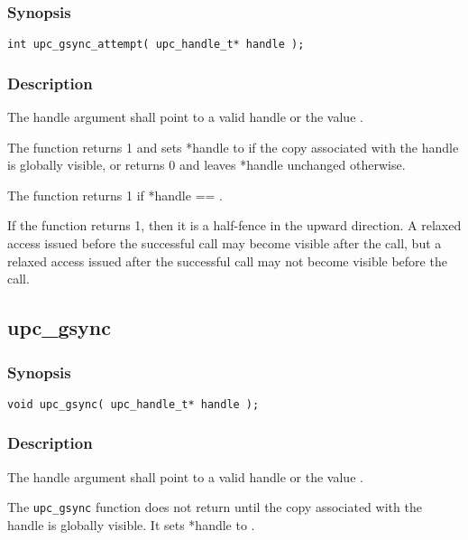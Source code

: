 \subsubsection{Synopsis}

\begin{verbatim}
int upc_gsync_attempt( upc_handle_t* handle ); 
\end{verbatim}

\subsubsection{Description}

\npf The handle argument shall point to a valid handle or the value
\complete{}.

\np The \function{} function returns 1 and sets *handle to \complete{}
if the copy associated with the handle is globally visible, or returns 0 and
leaves *handle unchanged otherwise.

\np The \function{} function returns 1 if *handle == \complete{}.

\np If the \function{} function returns 1, then it is a half-fence in
the upward direction.  A relaxed access issued before the successful
\function{} call may become visible after the call, but a relaxed access
issued after the successful \function{} call may not become visible before
the call.

\subsection{upc\_gsync}
\def\function{{\tt upc\_gsync}}

\subsubsection{Synopsis}

\begin{verbatim}
void upc_gsync( upc_handle_t* handle );
\end{verbatim}

\subsubsection{Description}

\npf The handle argument shall point to a valid handle or the value
\complete{}.

\np The \function{} function does not return until the copy associated
with the handle is globally visible.  It sets *handle to \complete{}.

